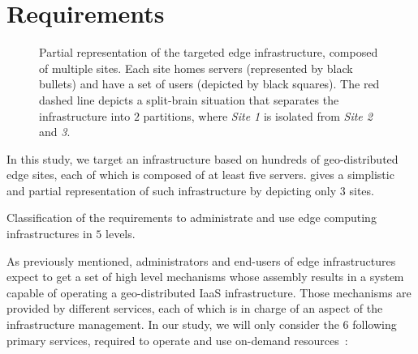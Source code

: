 
\section{Requirements}
\label{sec:requirements}

\begin{figure}[t]
  \centering
  \def\svgwidth{\columnwidth}
  
  \caption{Partial representation of the targeted edge infrastructure, composed
    of multiple sites. Each site homes servers (represented by black bullets)
    and have a set of users (depicted by black squares). The red dashed line
    depicts a split-brain situation that separates the infrastructure into $2$
    partitions, where \emph{Site 1} is isolated from \emph{Site 2} and \emph{3}.}
  \label{fig:sites}
\end{figure}

In this study, we target an infrastructure based on hundreds of geo-distributed
edge sites, each of which is composed of at least five servers.
 gives a simplistic and partial representation of such
infrastructure by depicting only $3$ sites.

\begin{table*}
    \centering
        
    \caption{Classification of the requirements to administrate and use edge
    computing infrastructures in $5$ levels.}
    \label{tab:requirements}
\end{table*}

As previously mentioned, administrators and end-users of edge infrastructures
expect to get a set of high level mechanisms whose assembly results in a system
capable of operating a geo-distributed IaaS infrastructure. Those mechanisms
are provided by different services, each of which is in charge of an aspect of
the infrastructure management. In our study, we will only consider the $6$
following primary services, required to operate and use on-demand
resources~\cite{moreno2012csp}:

